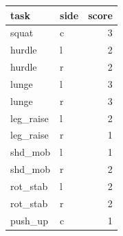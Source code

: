 \documentclass[
]{book}
\begin{document}
\begin{tabular}{l|l|r}
\hline
task & side & score\\
\hline
squat & c & 3\\
\hline
hurdle & l & 2\\
\hline
hurdle & r & 2\\
\hline
lunge & l & 3\\
\hline
lunge & r & 3\\
\hline
leg\_raise & l & 2\\
\hline
leg\_raise & r & 1\\
\hline
shd\_mob & l & 1\\
\hline
shd\_mob & r & 2\\
\hline
rot\_stab & l & 2\\
\hline
rot\_stab & r & 2\\
\hline
push\_up & c & 1\\
\hline
\end{tabular}
\end{document}
